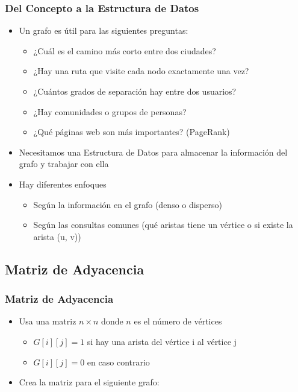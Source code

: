 \documentclass[11pt]{beamer}
\begin{document}
\begin{frame}\frametitle{Del Concepto a la Estructura de Datos}
\begin{itemize}
\item Un grafo es útil para las siguientes preguntas:
    \begin{itemize}
    \item ¿Cuál es el camino más corto entre dos ciudades?
    \item ¿Hay una ruta que visite cada nodo exactamente una vez? 
    \item ¿Cuántos grados de separación hay entre dos usuarios?
    \item ¿Hay comunidades o grupos de personas?
    \item ¿Qué páginas web son más importantes? (PageRank)
    \end{itemize}
\item Necesitamos una Estructura de Datos para almacenar la información del grafo y trabajar con ella
\item Hay diferentes enfoques
    \begin{itemize}
    \item Según la información en el grafo (denso o disperso)
    \item Según las consultas comunes (qué aristas tiene un vértice o si existe la arista (u, v))
    \end{itemize}
\end{itemize}
\end{frame}

\subsection{Matriz de Adyacencia}

\begin{frame}\frametitle{Matriz de Adyacencia}
\begin{itemize}
\item Usa una matriz $n\times n$ donde $n$ es el número de vértices
    \begin{itemize}
    \item $G[i][j] = 1$ si hay una arista del vértice i al vértice j
    \item $G[i][j] = 0$ en caso contrario
    \end{itemize}
\pause
\item Crea la matriz para el siguiente grafo:
\end{itemize}
\begin{center}
\end{center}
\end{frame}
\end{document}

